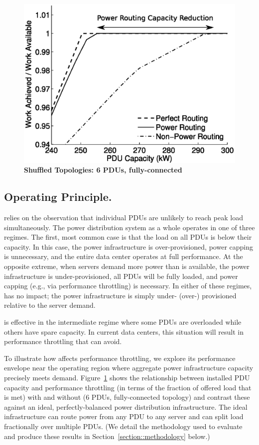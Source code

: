 \begin{figure}[b]
\centering
\includegraphics[width = 3.0 in]{Appendices/PowerRouting/figure/RoutingComparison.eps}
\caption{ \textbf{Shuffled Topologies: 6 PDUs, fully-connected}}
\label{figure::routingdemonstration}
\vspace{-.1 in}
\end{figure}

\subsection{Operating Principle.}

\PowerRouting relies on the observation that individual PDUs are unlikely to reach peak load simultaneously.
The power distribution system as a whole operates in one of three regimes.
The first, most common case is that the load on all PDUs is below their capacity.  In this case, the power infrastructure is over-provisioned, power capping is unnecessary, and the entire data center operates at full performance. At the opposite extreme, when servers demand more power than is available, the power infrastructure is under-provisioned, all PDUs will be fully loaded, and power capping (e.g., via performance throttling) is necessary.  In either of these regimes, \PowerRouting has no impact; the power infrastructure is simply under- (over-) provisioned relative to the server demand. 

\PowerRouting is effective in the intermediate regime where some PDUs are overloaded while others have spare capacity.  In current data centers, this situation will result in performance throttling that \PowerRouting can avoid.

To illustrate how \PowerRouting affects performance throttling, we explore its performance envelope near the operating region where aggregate power infrastructure capacity precisely meets demand.  Figure~\ref{figure::routingdemonstration} shows the relationship between installed PDU capacity and performance throttling (in terms of the fraction of offered load that is met) with and without  \PowerRouting (6 PDUs, fully-connected topology) and contrast these against an ideal, perfectly-balanced power distribution infrastructure.    The ideal infrastructure can route power from any PDU to any server and can split load fractionally over multiple PDUs.  (We detail the methodology used to evaluate \PowerRouting and produce these results in Section~\ref{section::methodology} below.)

